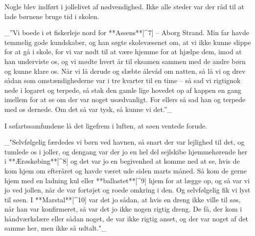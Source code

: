 \documentclass{book}
\begin{document}
Nogle blev indført i jollelivet af nødvendighed. Ikke alle steder var der råd til at lade
børnene bruge tid i skolen.

 _”Vi boede i et fiskerleje nord for **Assens**[^7] – Aborg Strand. Min far havde temmelig gode
kundskaber, og han søgte skolevæsenet om, at vi ikke kunne slippe for at gå i skole, for
vi var nødt til at være hjemme for at hjælpe dem, imod at han underviste os, og vi mødte
hvert år til eksamen sammen med de andre børn og kunne klare os. Når vi lå derude og
slæbte ålevåd om natten, så lå vi og drev sådan som omstændighederne var i tre kvarter til
en time – så sad vi rigtignok nede i logaret og terpede, så stak den gamle lige hovedet op
af kappen en gang imellem for at se om der var noget usædvanligt. For ellers så sad han og
terpede med os dernede. Om det så var tysk, så kunne vi det.”_


I søfartssamfundene lå det ligefrem i luften, at søen ventede forude.

 _"Selvfølgelig færdedes vi børn ved havnen, så snart der var lejlighed til det, og tumlede
os i joller, og dengang var der jo en hel del sejlskibe hjemmehørende her i **Ærøskøbing**[^8]
og det var jo en begivenhed at komme ned at se, hvis de kom hjem om efteråret og
havde været ude siden marts måned. Så kom de gerne hjem med en ladning kul eller
**ballastet**[^9] hjem for at lægge op, og så var vi jo ved jollen, når de var fortøjet
og roede omkring i den. Og selvfølgelig fik vi lyst til søen. I **Marstal**[^10] var det
jo sådan, at hvis en dreng ikke ville til søs, når han var konfirmeret, så var det
jo ikke nogen rigtig dreng. De få, der kom i håndværkslære eller sådan noget, de
var ikke rigtig anset, og der var noget af det samme her, men ikke så udtalt."_
\end{document}
